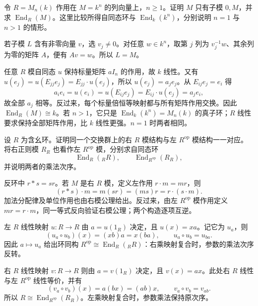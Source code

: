\begin{exercise}\label{b2:ex:02-matrix-standard-module}
	令 \(R=M_n(k)\) 作用在 \(M=k^n\) 的列向量上，\(n\ge1\)。证明 \(M\) 只有子模 \(0,M\)，并求 \(\operatorname{End}_R(M)\)。这里比较所得自同态环与 \(\operatorname{End}_k(k^n)\)，分别说明 \(n=1\) 与 \(n>1\) 的情形。
\end{exercise}
\begin{solution}
	若子模 \(L\) 含有非零向量 \(v\)，选 \(v_j\ne0\)。对任意 \(w\in k^n\)，取第 \(j\) 列为 \(v_j^{-1}w\)、其余列为零的矩阵 \(A\)，便有 \(Av=w\)。所以 \(L=M\)。

	任意 \(R\) 模自同态 \(u\) 保持标量矩阵 \(aI_n\) 的作用，故 \(k\) 线性。又有 \(u(e_j)=u(E_{jj}e_j)=E_{jj}\cdot u(e_j)\)，所以 \(u(e_j)=a_je_j\)。从 \(E_{ij}e_j=e_i\) 得
	\[
		a_ie_i=u(e_i)=u(E_{ij}e_j)=E_{ij}\cdot u(e_j)=a_je_i,
	\]
	故全部 \(a_j\) 相等。反过来，每个标量倍恒等映射都与所有矩阵作用交换。因此 \(\operatorname{End}_R(M)\cong k\)。若 \(n>1\)，它只是 \(\operatorname{End}_k(k^n)=M_n(k)\) 的真子环；\(R\) 线性要求保持全部矩阵作用，比 \(k\) 线性更强。\(n=1\) 时两者相同。
\end{solution}

\begin{exercise}\label{b2:ex:02-opposite-regular-endomorphisms}
	设 \(R\) 为含幺环。证明同一个交换群上的右 \(R\) 模结构与左 \(R^{\mathrm{op}}\) 模结构一一对应。将右正则模 \(R_R\) 也看作左 \(R^{\mathrm{op}}\) 模，分别求自同态环
	\[
		\operatorname{End}_R({}_RR),\qquad \operatorname{End}_{R^{\mathrm{op}}}(R_R),
	\]
	并说明两者的乘法次序。
\end{exercise}
\begin{solution}
	反环中 \(r*s=sr\)。若 \(M\) 是右 \(R\) 模，定义左作用 \(r\cdot m=mr\)，则
	\[
		(r*s)\cdot m=m(sr)=(ms)r=r\cdot(s\cdot m).
	\]
	加法分配律及单位作用也由右模公理给出。反过来，由左 \(R^{\mathrm{op}}\) 模作用定义 \(mr=r\cdot m\)，同一等式反向验证右模公理；两个构造逐项互逆。

	左 \(R\) 线性映射 \(u:R\to R\) 由 \(a=u(1_R)\) 决定，且 \(u(x)=xa\)。记它为 \(u_a\)，则
	\[
		(u_a\circ u_b)(x)=(xb)a=x(ba),\qquad u_a\circ u_b=u_{ba}.
	\]
	因此 \(a\mapsto u_a\) 给出环同构 \(R^{\mathrm{op}}\cong\operatorname{End}_R({}_RR)\)：右乘映射复合时，参数的乘法次序反转。

	右 \(R\) 线性映射 \(v:R\to R\) 则由 \(a=v(1_R)\) 决定，且 \(v(x)=ax\)。此处右 \(R\) 线性与左 \(R^{\mathrm{op}}\) 线性等价，并有
	\[
		(v_a\circ v_b)(x)=a(bx)=(ab)x,\qquad v_a\circ v_b=v_{ab}.
	\]
	所以 \(R\cong\operatorname{End}_{R^{\mathrm{op}}}(R_R)\)。左乘映射复合时，参数乘法保持原次序。
\end{solution}

